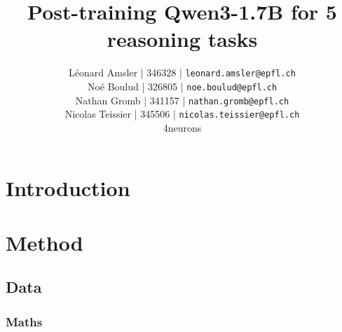 \documentclass[11pt]{article}
\title{Post-training Qwen3-1.7B for 5 reasoning tasks}
\author{\normalfont 
Léonard Amsler | 346328 | \texttt{leonard.amsler@epfl.ch} \\
Noé Boulud | 326805 | \texttt{noe.boulud@epfl.ch} \\
Nathan Gromb | 341157 | \texttt{nathan.gromb@epfl.ch} \\
Nicolas Teissier | 345506 | \texttt{nicolas.teissier@epfl.ch} \\
4neurons \\
}
\begin{document}
\maketitle
\thispagestyle{fancy}


\begin{abstract}
\end{abstract}





\section{Introduction}






\section{Method}
\label{sec:method}

\subsection{Data}

\subsubsection{Maths}
\end{document}

